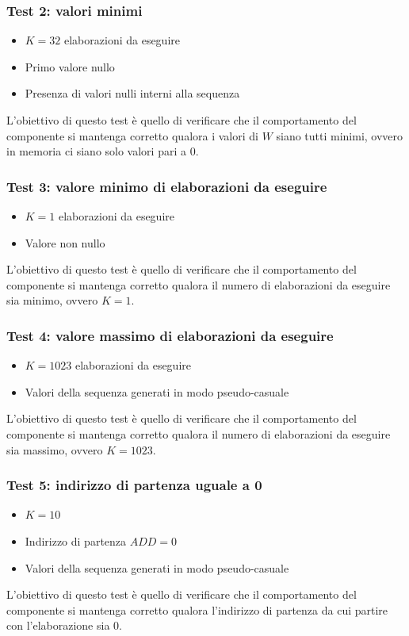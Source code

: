 \documentclass[10pt]{article}
\begin{document}
	\subsubsection{Test 2: valori minimi}
	\begin{itemize}
		\item $K=32$ elaborazioni da eseguire
		\item Primo valore nullo
		\item Presenza di valori nulli interni alla sequenza
	\end{itemize}
	L'obiettivo di questo test è quello di verificare che il comportamento del componente si mantenga corretto qualora i valori di $W$ siano tutti minimi, ovvero in memoria ci siano solo valori pari a 0.
	\subsubsection{Test 3: valore minimo di elaborazioni da eseguire}
	\begin{itemize}
		\item $K=1$ elaborazioni da eseguire
		\item Valore non nullo
	\end{itemize}
	L'obiettivo di questo test è quello di verificare che il comportamento del componente si mantenga corretto qualora il numero di elaborazioni da eseguire sia minimo, ovvero $K=1$.
	\subsubsection{Test 4: valore massimo di elaborazioni da eseguire}
	\begin{itemize}
		\item $K=1023$ elaborazioni da eseguire
		\item Valori della sequenza generati in modo pseudo-casuale
	\end{itemize}
	L'obiettivo di questo test è quello di verificare che il comportamento del componente si mantenga corretto qualora il numero di elaborazioni da eseguire sia massimo, ovvero $K=1023$.
	\subsubsection{Test 5: indirizzo di partenza uguale a 0}
	\begin{itemize}
		\item $K=10$
		\item Indirizzo di partenza $ADD=0$
		\item Valori della sequenza generati in modo pseudo-casuale
	\end{itemize}
	L'obiettivo di questo test è quello di verificare che il comportamento del componente si mantenga corretto qualora l'indirizzo di partenza da cui partire con l'elaborazione sia 0.
\end{document}
